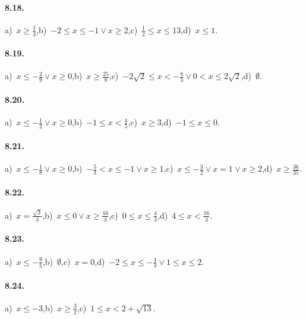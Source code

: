 \begin{multicols}{2}
\paragraph{8.18.} a)~$x\ge \frac 1 3$,\quad b)~$-2\le x\le -1\vee x\ge 2$,\quad c)~$\frac 1 2\le x\le 13$,\quad d)~$x\le 1$.

\paragraph{8.19.} a)~$x\le -\frac 2 9\vee x\ge 0$,\quad b)~$x\ge \frac{25} 8$,\quad c)~$-2\sqrt 2\le x<-\frac 8 3\vee 0<x\le 2\sqrt 2$,\quad d)~$ \emptyset $.

\paragraph{8.20.} a)~$x\le -\frac 1 2\vee x\ge 0$,\quad b)~$-1\le x<\frac 4 5$,\quad c)~$x\ge 3$,\quad d)~$-1\le x\le 0$.

\paragraph{8.21.} a)~$x\le -\frac 1 8\vee x\ge 0$,\quad b)~$-\frac 5 3<x\le -1\vee x\ge 1$,\quad c)~$x\le -\frac 3 2\vee x=1\vee x\ge 2$,\quad d)~$x\ge \frac{36}{35}$.

\paragraph{8.22.} a)~$x=\frac{\sqrt 3} 3$,\quad b)~$x\le 0\vee x\ge \frac{16} 3$,\quad c)~$0\le x\le \frac 4 3$,\quad d)~$4\le x<\frac{16} 3$.

\paragraph{8.23.} a)~$x\le -\frac 9 5$,\quad b)~$ \emptyset $,\quad c)~$x=0$,\quad d)~$-2\le x\le -\frac 4 3\vee 1\le x\le 2$.

\paragraph{8.24.} a)~$x\le -3$,\quad b)~$x\ge \frac 3 2$,\quad c)~$1\le x<2+\sqrt{13}$.
\end{multicols}